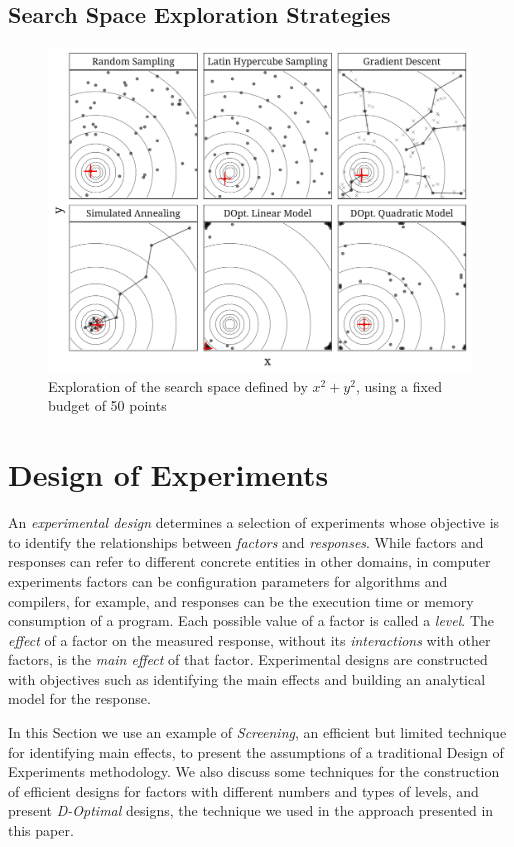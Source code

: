 \documentclass[conference]{IEEEtran}
\begin{document}
\subsection{Search Space Exploration Strategies}
\label{sec:org741e773}
\begin{center}
\begin{figure}[htbp]
\centering
\includegraphics[width=.95\columnwidth]{./img/sampling_comparison.pdf}
\caption{Exploration of the search space defined by \(x^2 + y^2\), using a fixed budget of 50 points}
\end{figure}
\end{center}
\section{Design of Experiments}
\label{sec:org01d3531}
An \emph{experimental design} determines a selection of experiments whose objective
is to identify the relationships between \emph{factors} and \emph{responses}. While
factors and responses can refer to different concrete entities in other domains,
in computer experiments factors can be configuration parameters for algorithms
and compilers, for example, and responses can be the execution time or memory
consumption of a program. Each possible value of a factor is called a \emph{level}.
The \emph{effect} of a factor on the measured response, without its \emph{interactions}
with other factors, is the \emph{main effect} of that factor. Experimental designs
are constructed with objectives such as identifying the main effects and
building an analytical model for the response.

In this Section we use an example of \emph{Screening}, an efficient but limited
technique for identifying main effects, to present the assumptions of a
traditional Design of Experiments methodology. We also discuss some techniques
for the construction of efficient designs for factors with different numbers and
types of levels, and present \emph{D-Optimal} designs, the technique we used in the
approach presented in this paper.
\end{document}
